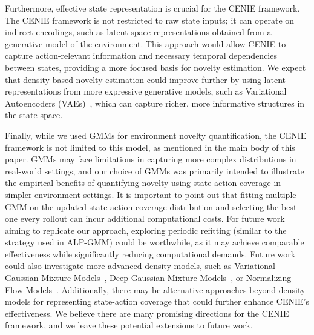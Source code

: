 Furthermore, effective state representation is crucial for the CENIE framework. The CENIE framework is not restricted to raw state inputs; it can operate on indirect encodings, such as latent-space representations obtained from a generative model of the environment. This approach would allow CENIE to capture action-relevant information and necessary temporal dependencies between states, providing a more focused basis for novelty estimation. We expect that density-based novelty estimation could improve further by using latent representations from more expressive generative models, such as Variational Autoencoders (VAEs)~\cite{kingma2022autoencodingvariationalbayes}, which can capture richer, more informative structures in the state space.

Finally, while we used GMMs for environment novelty quantification, the CENIE framework is not limited to this model, as mentioned in the main body of this paper. GMMs may face limitations in capturing more complex distributions in real-world settings, and our choice of GMMs was primarily intended to illustrate the empirical benefits of quantifying novelty using state-action coverage in simpler environment settings. It is important to point out that fitting multiple GMM on the updated state-action coverage distribution and selecting the best one every rollout can incur additional computational costs. For future work aiming to replicate our approach, exploring periodic refitting (similar to the strategy used in ALP-GMM) could be worthwhile, as it may achieve comparable effectiveness while significantly reducing computational demands. Future work could also investigate more advanced density models, such as Variational Gaussian Mixture Models~\cite{blei2006variational}, Deep Gaussian Mixture Models~\cite{viroli2017deepgaussianmixturemodels}, or Normalizing Flow Models~\cite{rezende2016variational}. Additionally, there may be alternative approaches beyond density models for representing state-action coverage that could further enhance CENIE’s effectiveness. We believe there are many promising directions for the CENIE framework, and we leave these potential extensions to future work.


